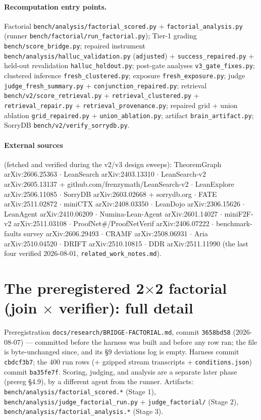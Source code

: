 \documentclass[10pt]{article}
\newcommand{\code}[1]{\texttt{#1}}
\begin{document}
\paragraph{Recomputation entry points.} Factorial
\code{bench/analysis/factorial\_scored.py} +
\code{factorial\_analysis.py} (runner
\code{bench/factorial/run\_factorial.py}); Tier-1 grading
\code{bench/score\_bridge.py}; repaired instrument
\code{bench/analysis/halluc\_validation.py} (\code{adjusted}) +
\code{success\_repaired.py} + held-out revalidation
\code{halluc\_holdout.py}; post-gate analyses
\code{v3\_gate\_fixes.py}; clustered inference
\code{fresh\_clustered.py}; exposure \code{fresh\_exposure.py}; judge
\code{judge\_fresh\_summary.py} + \code{conjunction\_repaired.py};
retrieval \code{bench/v2/score\_retrieval.py} +
\code{retrieval\_clustered.py} + \code{retrieval\_repair.py} +
\code{retrieval\_provenance.py}; repaired grid + union ablation
\code{grid\_repaired.py} + \code{union\_ablation.py}; artifact
\code{brain\_artifact.py}; SorryDB \code{bench/v2/verify\_sorrydb.py}.

\paragraph{External sources} (fetched and verified during the v2/v3
design sweeps): TheoremGraph arXiv:2606.25363 $\cdot$ LeanSearch
arXiv:2403.13310 $\cdot$ LeanSearch-v2 arXiv:2605.13137 +
github.com/frenzymath/LeanSearch-v2 $\cdot$ LeanExplore
arXiv:2506.11085 $\cdot$ SorryDB arXiv:2603.02668 + sorrydb.org
$\cdot$ FATE arXiv:2511.02872 $\cdot$ miniCTX arXiv:2408.03350 $\cdot$
LeanDojo arXiv:2306.15626 $\cdot$ LeanAgent arXiv:2410.06209 $\cdot$
Numina-Lean-Agent arXiv:2601.14027 $\cdot$ miniF2F-v2
arXiv:2511.03108 $\cdot$ ProofNet\#/ProofNetVerif arXiv:2406.07222
$\cdot$ benchmark-faults survey arXiv:2606.29493 $\cdot$ CRAMF
arXiv:2508.06931 $\cdot$ Aria arXiv:2510.04520 $\cdot$ DRIFT
arXiv:2510.10815 $\cdot$ DDR arXiv:2511.11990 (the last four verified
2026-08-01, \code{related\_work\_notes.md}).


\section{The preregistered 2$\times$2 factorial (join $\times$ verifier): full detail}\label{s15}

Preregistration \code{docs/research/BRIDGE-FACTORIAL.md}, commit
\code{3658bd58} (2026-08-07) --- committed before the harness was built
and before any row ran; the file is byte-unchanged since, and its \S 9
deviations log is empty. Harness commit \code{cbdcf3b7}; the 400 run
rows (+ gzipped stream transcripts + \code{conditions.json}) commit
\code{ba35fe7f}. Scoring, judging, and analysis are a separate later
phase (prereg \S 4.9), by a different agent from the runner. Artifacts:
\code{bench/analysis/factorial\_scored.*} (Stage 1),
\code{bench/analysis/judge\_factorial\_run.py} +
\code{judge\_factorial/} (Stage 2),
\code{bench/analysis/factorial\_analysis.*} (Stage 3).
\end{document}
